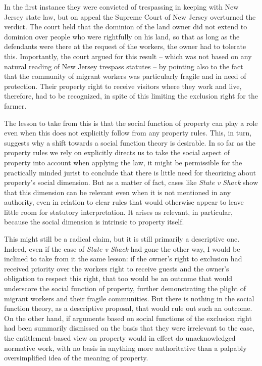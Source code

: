 In the first instance they were convicted of trespassing in keeping with New Jersey state law, but on appeal the Supreme Court of New Jersey overturned the verdict. The court held that the dominion of the land owner did not extend to dominion over people who were rightfully on his land, so that as long as the defendants were there at the request of the workers, the owner had to tolerate this. Importantly, the court argued for this result -- which was not based on any natural reading of New Jersey trespass statutes -- by pointing also to the fact that the community of migrant workers was particularly fragile and in need of protection. Their property right to receive visitors where they work and live, therefore, had to be recognized, in spite of this limiting the exclusion right for the farmer. 

The lesson to take from this is that the social function of property can play a role even when this does not explicitly follow from any property rules. This, in turn, suggests why a shift towards a social function theory is desirable. In so far as the property rules we rely on explicitly directs us to take the social aspect of property into account when applying the law, it might be permissible for the practically minded jurist to conclude that there is little need for theorizing about property's social dimension. But as a matter of fact, cases like {\it State v Shack} show that this dimension can be relevant even when it is not mentioned in any authority, even in relation to clear rules that would otherwise appear to leave little room for statutory interpretation. It arises as relevant, in particular, because the social dimension is intrinsic to property itself. 

This might still be a radical claim, but it is still primarily a descriptive one. Indeed, even if the case of {\it State v Shack} had gone the other way, I would be inclined to take from it the same lesson: if the owner's right to exclusion had received priority over the workers right to receive guests and the owner's obligation to respect this right, that too would be an outcome that would underscore the social function of property, further demonstrating the plight of migrant workers and their fragile communities. But there is nothing in the social function theory, as a descriptive proposal, that would rule out such an outcome. On the other hand, if arguments based on social functions of the exclusion right had been summarily dismissed on the basis that they were irrelevant to the case, the entitlement-based view on property would in effect do unacknowledged normative work, with no basis in anything more authoritative than a palpably oversimplified idea of the meaning of property.

